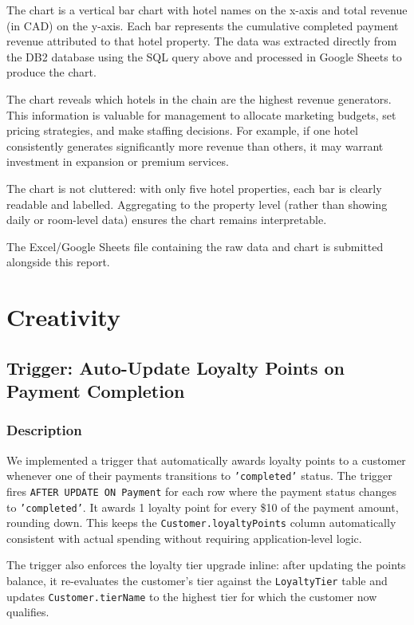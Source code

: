 \documentclass[12pt,letterpaper]{article}
\begin{document}
The chart is a vertical bar chart with hotel names on the x-axis and total revenue (in CAD) on the y-axis. Each bar represents the cumulative completed payment revenue attributed to that hotel property. The data was extracted directly from the DB2 database using the SQL query above and processed in Google Sheets to produce the chart.

The chart reveals which hotels in the chain are the highest revenue generators. This information is valuable for management to allocate marketing budgets, set pricing strategies, and make staffing decisions. For example, if one hotel consistently generates significantly more revenue than others, it may warrant investment in expansion or premium services.

The chart is not cluttered: with only five hotel properties, each bar is clearly readable and labelled. Aggregating to the property level (rather than showing daily or room-level data) ensures the chart remains interpretable.

The Excel/Google Sheets file containing the raw data and chart is submitted alongside this report.

\section{Creativity}

\subsection*{Trigger: Auto-Update Loyalty Points on Payment Completion}

\subsubsection*{Description}

We implemented a trigger that automatically awards loyalty points to a customer whenever one of their payments transitions to \texttt{'completed'} status. The trigger fires \texttt{AFTER UPDATE ON Payment} for each row where the payment status changes to \texttt{'completed'}. It awards 1 loyalty point for every \$10 of the payment amount, rounding down. This keeps the \texttt{Customer.loyaltyPoints} column automatically consistent with actual spending without requiring application-level logic.

The trigger also enforces the loyalty tier upgrade inline: after updating the points balance, it re-evaluates the customer's tier against the \texttt{LoyaltyTier} table and updates \texttt{Customer.tierName} to the highest tier for which the customer now qualifies.
\end{document}
